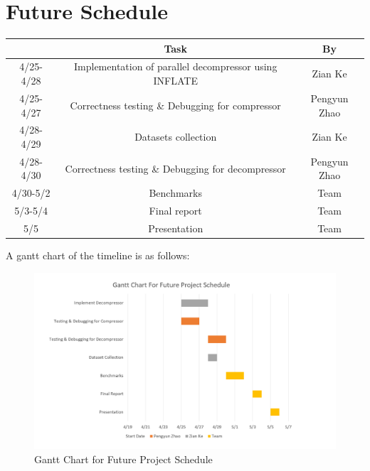 \documentclass{article}
\begin{document}
\section{Future Schedule}
\begin{table}[!hbp]
\begin{center}
\begin{tabular}{|c|c|c|}
\hline
 & Task & By\\ \hline
4/25-4/28 & Implementation of parallel decompressor using INFLATE & Zian Ke \\ \hline
4/25-4/27 & Correctness testing \& Debugging for compressor & Pengyun Zhao\\ \hline
4/28-4/29 & Datasets collection & Zian Ke \\ \hline
4/28-4/30 & Correctness testing \& Debugging for decompressor & Pengyun Zhao\\ \hline
4/30-5/2 & Benchmarks & Team\\ \hline
5/3-5/4 & Final report & Team\\ \hline
5/5 & Presentation & Team\\ \hline
\end{tabular}
\end{center}
\end{table}
A gantt chart of the timeline is as follows:
\newpage
\begin{figure}[!h]
    \begin{center}
        \includegraphics[width = 15cm]{gantt.png}
        \caption{Gantt Chart for Future Project Schedule}
    \end{center}
\end{figure}
\end{document}
